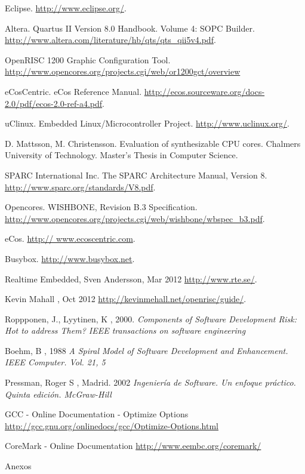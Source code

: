 \documentclass[a4paper,12pt]{report}
\begin{document}
\begin{thebibliography}{99}
Eclipse. \url{http://www.eclipse.org/}.

Altera. Quartus II Version 8.0 Handbook. Volume 4: SOPC Builder. 
\url{http://www.altera.com/literature/hb/qts/qts_qii5v4.pdf}.

OpenRISC 1200 Graphic Configuration Tool. \url{http://www.opencores.org/projects.cgi/web/or1200gct/overview}

 eCosCentric. eCos Reference Manual. \url{http://ecos.sourceware.org/docs-2.0/pdf/ecos-2.0-ref-a4.pdf}.

 uClinux. Embedded Linux/Microcontroller Project. \url{http://www.uclinux.org/}.

 D. Mattsson, M. Christensson. Evaluation of synthesizable CPU cores. Chalmers University of Technology. Master's Thesis in Computer Science.

 SPARC International Inc. The SPARC Architecture Manual, Version 8. 
\url{http://www.sparc.org/standards/V8.pdf}.

 Opencores. WISHBONE, Revision B.3 Specification.  \url{http://www.opencores.org/projects.cgi/web/wishbone/wbspec_b3.pdf}.

 eCos. 
 \url{http:// www.ecoscentric.com}.

 Busybox.
 \url{http://www.busybox.net}.

 Realtime Embedded, Sven Andersson, Mar 2012 
 \url{http://www.rte.se/}.

 Kevin Mahall , Oct 2012
 \url{http://kevinmehall.net/openrisc/guide/}.


 Roppponen, J., Lyytinen, K , 2000. 
\textit{Components of Software Development Risk: Hot to address Them? IEEE transactions on software engineering}

 Boehm, B , 1988  
\textit{A Spiral Model of Software Development and Enhancement. IEEE Computer. Vol. 21, 5} 

 Pressman, Roger S , Madrid. 2002
\textit{Ingeniería de Software. Un enfoque práctico. Quinta edición. McGraw-Hill} 

 GCC - Online Documentation - Optimize Options
\url {http://gcc.gnu.org/onlinedocs/gcc/Optimize-Options.html} 

 CoreMark  - Online Documentation
\url {http://www.eembc.org/coremark/} 


\end{thebibliography}

\appendix
\begin{part}{Anexos}
\newpage

\newpage
\end{part}
\end{document}
